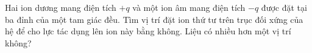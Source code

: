    
     \begin{vd}
    Hai ion dương mang điện tích $+q$ và một ion âm mang điện tích $-q$ được đặt tại ba đỉnh của một tam giác đều. Tìm vị trí đặt ion thứ tư trên trục đối xứng của hệ để cho lực tác dụng lên ion này bằng không. Liệu có nhiều hơn một vị trí không?
    \end{vd}
     \begin{loigiai}
    \hfill \\
    \begin{center}

\begin{tikzpicture}[x=0.75pt,y=0.75pt,yscale=-1,xscale=1]


\end{tikzpicture}
\end{center}
\end{loigiai}
